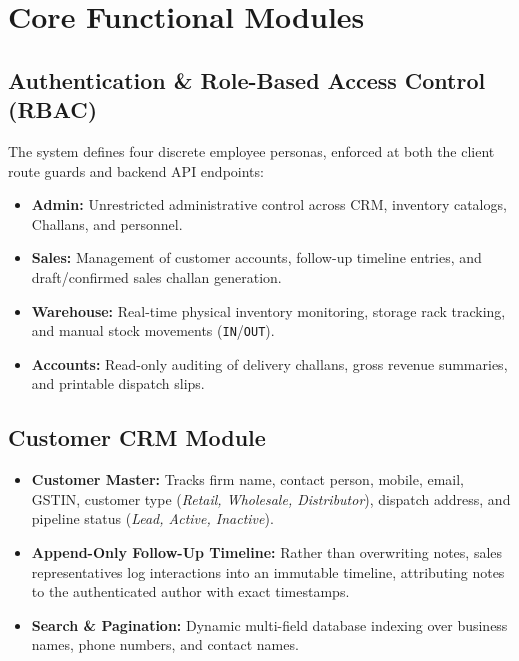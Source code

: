\documentclass[11pt,a4paper]{article}
\begin{document}
\section{Core Functional Modules}

\subsection{Authentication \& Role-Based Access Control (RBAC)}
The system defines four discrete employee personas, enforced at both the client route guards and backend API endpoints:
\begin{itemize}[itemsep=0.3em]
    \item \textbf{Admin:} Unrestricted administrative control across CRM, inventory catalogs, Challans, and personnel.
    \item \textbf{Sales:} Management of customer accounts, follow-up timeline entries, and draft/confirmed sales challan generation.
    \item \textbf{Warehouse:} Real-time physical inventory monitoring, storage rack tracking, and manual stock movements (\texttt{IN}/\texttt{OUT}).
    \item \textbf{Accounts:} Read-only auditing of delivery challans, gross revenue summaries, and printable dispatch slips.
\end{itemize}

\subsection{Customer CRM Module}
\begin{itemize}[itemsep=0.3em]
    \item \textbf{Customer Master:} Tracks firm name, contact person, mobile, email, GSTIN, customer type (\textit{Retail, Wholesale, Distributor}), dispatch address, and pipeline status (\textit{Lead, Active, Inactive}).
    \item \textbf{Append-Only Follow-Up Timeline:} Rather than overwriting notes, sales representatives log interactions into an immutable timeline, attributing notes to the authenticated author with exact timestamps.
    \item \textbf{Search \& Pagination:} Dynamic multi-field database indexing over business names, phone numbers, and contact names.
\end{itemize}
\end{document}
